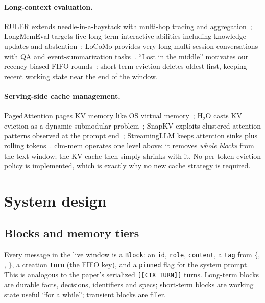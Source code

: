 \documentclass[10pt]{article}
\begin{document}
\paragraph{Long-context evaluation.} RULER extends needle-in-a-haystack with multi-hop tracing and aggregation~\cite{ruler}; LongMemEval targets five long-term interactive abilities including knowledge updates and abstention~\cite{longmemeval}; LoCoMo provides very long multi-session conversations with QA and event-summarization tasks~\cite{locomo}. ``Lost in the middle'' motivates our recency-biased FIFO rounds~\cite{lostmiddle}: short-term eviction deletes oldest first, keeping recent working state near the end of the window.

\paragraph{Serving-side cache management.} PagedAttention pages KV memory like OS virtual memory~\cite{paged}; H$_2$O casts KV eviction as a dynamic submodular problem~\cite{h2o}; SnapKV exploits clustered attention patterns observed at the prompt end~\cite{snapkv}; StreamingLLM keeps attention sinks plus rolling tokens~\cite{streamingllm}. clm-mem operates one level above: it removes \emph{whole blocks} from the text window; the KV cache then simply shrinks with it. No per-token eviction policy is implemented, which is exactly why no new cache strategy is required.

\section{System design}
\subsection{Blocks and memory tiers}
Every message in the live window is a \texttt{Block}: an \texttt{id}, \texttt{role}, \texttt{content}, a \texttt{tag} from $\{$, , $\}$, a creation \texttt{turn} (the FIFO key), and a \texttt{pinned} flag for the system prompt. This is analogous to the paper's serialized \verb|[[CTX_TURN]]| turns. Long-term blocks are durable facts, decisions, identifiers and specs; short-term blocks are working state useful ``for a while''; transient blocks are filler.
\end{document}
